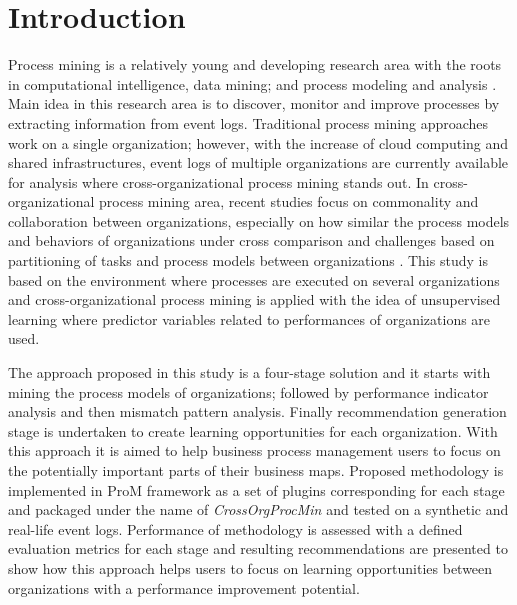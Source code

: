 \section{Introduction}
\label{sec:introduction}

Process mining is a relatively young and developing research area with the roots in computational intelligence, data mining; and process modeling and analysis \cite{van2012process}. Main idea in this research area is to discover, monitor and improve processes by extracting information from event logs. Traditional process mining approaches work on a single organization; however, with the increase of cloud computing and shared infrastructures, event logs of multiple organizations are currently available for analysis where cross-organizational process mining stands out. In cross-organizational process mining area, recent studies focus on commonality and collaboration between organizations, especially on how similar the process models and behaviors of organizations under cross comparison \cite{buijs2012towards} and challenges based on partitioning of tasks and process models between organizations \cite{van2011intra}. This study is based on the environment where processes are executed on several organizations and cross-organizational process mining is applied with the idea of unsupervised learning where predictor variables related to performances of organizations are used.

The approach proposed in this study is a four-stage solution and it starts with mining the process models of organizations; followed by performance indicator analysis and then mismatch pattern analysis. Finally recommendation generation stage is undertaken to create learning opportunities for each organization. With this approach it is aimed to help business process management users to focus on the potentially important parts of their business maps. Proposed methodology is implemented in ProM framework \cite{verbeek2010prom} as a set of plugins corresponding for each stage and packaged under the name of \textit{CrossOrgProcMin} and tested on a synthetic and real-life event logs. Performance of methodology is assessed with a defined evaluation metrics for each stage and resulting recommendations are presented to show how this approach helps users to focus on learning opportunities between organizations with a performance improvement potential.

